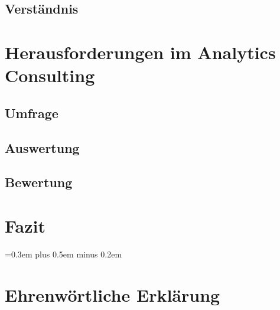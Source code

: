 \documentclass[
	12pt, %
	a4paper,
	bibliography=totoc, %
	numbers=noenddot, %
	ngerman, %
	headsepline, %
	oneside %
	]{scrbook} %
\begin{document}
\section{Verständnis}\label{subsec:verstaendins}


% 
\chapter{Herausforderungen im Analytics Consulting}\label{ch:umfrage}


\section{Umfrage}\label{sec:aufbau}


\section{Auswertung}\label{sec:auswertung}


\section{Bewertung}\label{sec:bewertung}



\chapter{Fazit}\label{ch:fazit}


\spaceskip=0.3em plus 0.5em minus 0.2em

\printbibliography{}


\chapter*{Ehrenwörtliche Erklärung}

\end{document}
